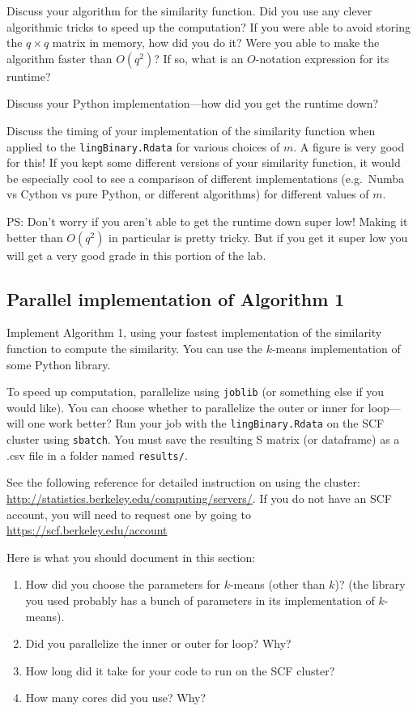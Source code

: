 \documentclass[letterpaper,12pt]{article}
\begin{document}
Discuss your algorithm for the similarity function. Did you use any clever algorithmic tricks to speed up the computation? If you were able to avoid storing the $q\times q$ matrix in memory, how did you do it? Were you able to make the algorithm faster than $O(q^2)$? If so, what is an $O$-notation expression for its runtime?

Discuss your Python implementation---how did you get the runtime down?

Discuss the timing of your implementation of the similarity function when applied to the \texttt{lingBinary.Rdata} for various choices of $m$. A figure is very good for this! If you kept some different versions of your similarity function, it would be especially cool to see a comparison of different implementations (e.g.~Numba vs Cython vs pure Python, or different algorithms) for different values of $m$.

PS: Don't worry if you aren't able to get the runtime down super low! Making it better than $O(q^2)$ in particular is pretty tricky. But if you get it super low you will get a very good grade in this portion of the lab.

\subsection{Parallel implementation of Algorithm 1}
Implement Algorithm 1, using your fastest implementation of the similarity function to compute the similarity. You can use the $k$-means implementation of some Python library.

To speed up computation, parallelize using \texttt{joblib} (or something else if you would like). You can choose whether to parallelize the outer or inner for loop---will one work better? Run your job with the \texttt{lingBinary.Rdata} on the SCF cluster using \texttt{sbatch}. You must save the resulting S matrix (or dataframe) as a .csv file in a folder named \texttt{results/}.

See the following reference for detailed instruction on using the cluster: \url{http://statistics.berkeley.edu/computing/servers/}. If you do not have an SCF account, you will need to request one by going to \url{https://scf.berkeley.edu/account}

Here is what you should document in this section:
\begin{enumerate}
    \item How did you choose the parameters for $k$-means (other than $k$)? (the library you used probably has a bunch of parameters in its implementation of $k$-means).
    \item Did you parallelize the inner or outer for loop? Why?
    \item How long did it take for your code to run on the SCF cluster?
    \item How many cores did you use? Why?
\end{enumerate}
\end{document}
